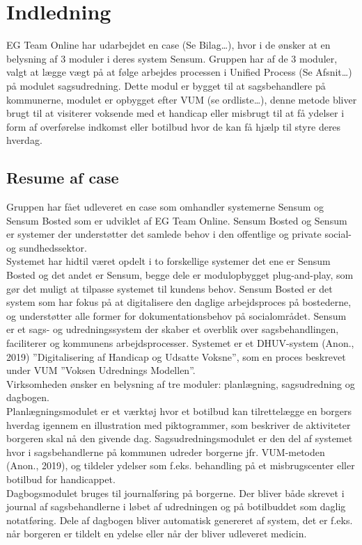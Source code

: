 \chapter{Indledning}
EG Team Online har udarbejdet en case (Se Bilag…), hvor i de ønsker at en belysning af 3 moduler i deres system Sensum. Gruppen har af de 3 moduler, valgt at lægge vægt på at følge arbejdes processen i Unified Process (Se Afsnit…) på modulet sagsudredning. Dette modul er bygget til at sagsbehandlere på kommunerne, modulet er opbygget efter VUM (se ordliste…), denne metode bliver brugt til at visiterer voksende med et handicap eller misbrugt til at få ydelser i form af overførelse indkomst eller botilbud hvor de kan få hjælp til styre deres hverdag.
\section{Resume af case}
Gruppen har fået udleveret en case som omhandler systemerne Sensum og Sensum Bosted som er udviklet af EG Team Online. Sensum Bosted og Sensum er systemer der understøtter det samlede behov i den offentlige og private social- og sundhedssektor.\\
Systemet har hidtil været opdelt i to forskellige systemer det ene er Sensum Bosted og det andet er Sensum, begge dele er modulopbygget plug-and-play, som gør det muligt at tilpasse systemet til kundens behov. Sensum Bosted er det system som har fokus på at digitalisere den daglige arbejdsproces på bostederne, og understøtter alle former for dokumentationsbehov på socialområdet. Sensum er et sags- og udredningssystem der skaber et overblik over sagsbehandlingen, faciliterer og kommunens arbejdsprocesser. Systemet er et DHUV-system 
(Anon., 2019) %
”Digitalisering af Handicap og Udsatte Voksne”, som en proces beskrevet under VUM ”Voksen Udrednings Modellen”.\\
Virksomheden ønsker en belysning af tre moduler: planlægning, sagsudredning og dagbogen. \\
Planlægningsmodulet er et værktøj hvor et botilbud kan tilrettelægge en borgers hverdag igennem en illustration med piktogrammer, som beskriver de aktiviteter borgeren skal nå den givende dag.
Sagsudredningsmodulet er den del af systemet hvor i sagsbehandlerne på kommunen udreder borgerne jfr. VUM-metoden 
(Anon., 2019), %
og tildeler ydelser som f.eks. behandling på et misbrugscenter eller botilbud for handicappet.\\
Dagbogsmodulet bruges til journalføring på borgerne. Der bliver både skrevet i journal af sagsbehandlerne i løbet af udredningen og på botilbuddet som daglig notatføring. Dele af dagbogen bliver automatisk genereret af system, det er f.eks. når borgeren er tildelt en ydelse eller når der bliver udleveret medicin.
